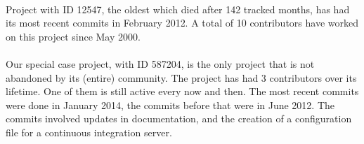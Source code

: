 \paragraph{}
Project with ID 12547, the oldest which died after 142 tracked months, has had
its most recent commits in February 2012. A total of 10 contributors have worked
on this project since May 2000.

\paragraph{}
Our special case project, with ID 587204, is the only project that is not
abandoned by its (entire) community. The project has had 3 contributors over its
lifetime. One of them is still active every now and then. The most recent
commits were done in January 2014, the commits before that were in June 2012.
The commits involved updates in documentation, and the creation of a
configuration file for a continuous integration server.

\begin{comment}
This chapter presents and clarifies the results obtained during the research.
The focus should be on the factual results, not the interpretation or
discussion. Tables and graphics should be used to increase the clarity of the
results where applicable.
Have a look at the the results chapter in this example thesis on Paul’s
homepage\footnote{http://homepages.cwi.nl/~paulk/thesesMasterSoftwareEngineering/2006/ArnoldLankamp.pdf}.
\end{comment}
